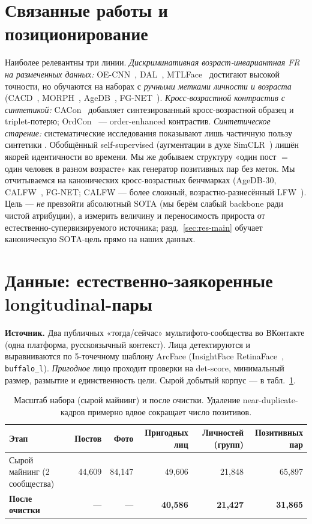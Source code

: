 \documentclass[10pt,twocolumn,letterpaper]{article}
\begin{document}
\section{Связанные работы и позиционирование}\label{sec:related}
Наиболее релевантны три линии. \emph{Дискриминативная возраст-инвариантная FR на размеченных данных:}
OE-CNN~\cite{wang2018oecnn}, DAL~\cite{wang2019dal}, MTLFace~\cite{huang2021mtlface} достигают высокой
точности, но обучаются на наборах с \emph{ручными метками личности и возраста} (CACD~\cite{chen2014cacd},
MORPH~\cite{ricanek2006morph}, AgeDB~\cite{moschoglou2017agedb}, FG-NET~\cite{panis2016fgnet}).
\emph{Кросс-возрастной контрастив с синтетикой:} CACon~\cite{wang2024cacon} добавляет синтезированный
кросс-возрастной образец и triplet-потерю; OrdCon~\cite{wang2025ordcon} — order-enhanced контрастив.
\emph{Синтетическое старение:} систематические исследования показывают лишь частичную пользу синтетики
\cite{yao2024synthageing}. Обобщённый self-supervised (аугментации в духе SimCLR~\cite{chen2020simclr})
лишён якорей идентичности во времени. Мы же добываем структуру «один пост $=$ один человек в разном
возрасте» как генератор позитивных пар без меток. Мы отчитываемся на канонических кросс-возрастных
бенчмарках (AgeDB-30, CALFW~\cite{zheng2017calfw}, FG-NET; CALFW — более сложный, возрастно-разнесённый
LFW~\cite{huang2007lfw}). Цель — \emph{не} превзойти абсолютный SOTA (мы берём слабый backbone ради
чистой атрибуции), а измерить величину и переносимость прироста от естественно-супервизируемого
источника; разд.~\ref{sec:res-main} обучает каноническую SOTA-цель прямо на наших данных.

\section{Данные: естественно-заякоренные longitudinal-пары}\label{sec:data}
\textbf{Источник.} Два публичных «тогда/сейчас» мультифото-сообщества во ВКонтакте (одна платформа,
русскоязычный контекст). Лица детектируются и выравниваются по 5-точечному шаблону ArcFace (InsightFace
RetinaFace~\cite{deng2020retinaface}, \texttt{buffalo\_l}). \emph{Пригодное} лицо проходит проверки на
det-score, минимальный размер, размытие и единственность цели. Сырой добытый корпус — в табл.~\ref{tab:scale}.

\begin{table}[t]
\centering
\small
\begin{tabular}{@{}lrrrrr@{}}
\toprule
Этап & Постов & Фото & Пригодных лиц & Личностей (групп) & Позитивных пар \\
\midrule
Сырой майнинг (2 сообщества) & 44{,}609 & 84{,}147 & 49{,}606 & 21{,}848 & 65{,}897 \\
\textbf{После очистки} & --- & --- & \textbf{40{,}586} & \textbf{21{,}427} & \textbf{31{,}865} \\
\bottomrule
\end{tabular}
\caption{Масштаб набора (сырой майнинг) и после очистки. Удаление near-duplicate-кадров примерно
вдвое сокращает число позитивов.}
\label{tab:scale}
\end{table}
\end{document}
